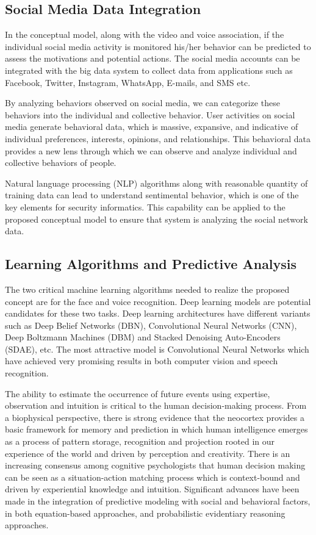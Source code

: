 \documentclass[sigconf]{acmart}
\begin{document}
\subsection{Social Media Data Integration}
In the conceptual model, along with the video and voice association, if the individual social media activity is monitored his/her behavior can be predicted to assess the motivations and potential actions. The social media accounts can be integrated with the big data system to collect data from applications such as Facebook, Twitter, Instagram, WhatsApp, E-mails, and SMS etc.

By analyzing behaviors observed on social media, we can categorize these behaviors into the individual and collective behavior. User activities on social media generate behavioral data, which is massive, expansive, and indicative of individual preferences, interests, opinions, and relationships. This behavioral data provides a new lens through which we can observe and analyze individual and collective behaviors of people.

Natural language processing (NLP) algorithms along with reasonable quantity of training data can lead to understand sentimental behavior, which is one of the key elements for security informatics. This capability can be applied to the proposed conceptual model to ensure that system is analyzing the social network data.

\subsection{Learning Algorithms and Predictive Analysis}
The two critical machine learning algorithms needed to realize the proposed concept are for the face and voice recognition. Deep learning models are potential candidates for these two tasks. Deep learning architectures have different variants such as Deep Belief Networks (DBN)\cite{Hinton2009}, Convolutional Neural Networks (CNN)\cite{NIPS2012-4824}, Deep Boltzmann Machines (DBM)\cite{pmlr-v9-salakhutdinov10a} and Stacked Denoising Auto-Encoders (SDAE)\cite{Vincent2010}, etc. The most attractive model is Convolutional Neural Networks which have achieved very promising results in both computer vision and speech recognition.

 The ability to estimate the occurrence of future events using expertise, observation and intuition is critical to the human decision-making process. From a biophysical perspective, there is strong evidence that the neocortex provides a basic framework for memory and prediction in which human intelligence emerges as a process of pattern storage, recognition and projection rooted in our experience of the world and driven by perception and creativity. There is an increasing consensus among cognitive psychologists that human decision making can be seen as a situation-action matching process which is context-bound and driven by experiential knowledge and intuition. Significant advances have been made in the integration of predictive modeling with social and behavioral factors, in both equation-based approaches, and probabilistic evidentiary reasoning approaches\cite{Sanfilippo2012}. 
\end{document}
